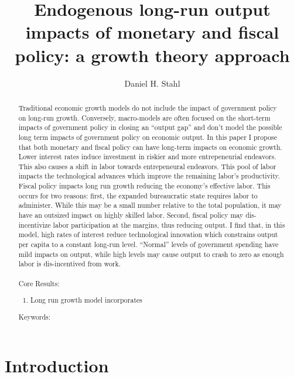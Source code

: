 \documentclass[12pt]{article}
\theoremstyle{definition}
\begin{document}
\title{Endogenous long-run output impacts of monetary and fiscal policy: a growth theory approach}
\date{}
\author{Daniel H. Stahl}

\maketitle

\newpage
 \begin{abstract}

Traditional economic growth models do not include the impact of government policy on long-run growth.  Conversely, macro-models are often focused on the short-term impacts of government policy in closing an ``output gap'' and don't model the possible long term impacts of government policy on economic output.  In this paper I propose that both monetary and fiscal policy can have long-term impacts on economic growth.  Lower interest rates induce investment in riskier and more entrepeneurial endeavors.  This also causes a shift in labor towards entrepeneural endeavors.  This pool of labor impacts the technological advances which improve the remaining labor's productivity.  Fiscal policy impacts long run growth reducing the economy's effective labor.  This occurs for two reasons: first, the expanded bureaucratic state requires labor to administer.  While this may be a small number relative to the total population, it may have an outsized impact on highly skilled labor.  Second, fiscal policy may dis-incentivize labor participation at the margins, thus reducing output.  I find that, in this model, high rates of interest reduce technological innovation which constrains output per capita to a constant long-run level.  ``Normal'' levels of government spending have mild impacts on output, while high levels may cause output to crash to zero as enough labor is dis-incentived from work.   
\\
\\
Core Results:
\begin{enumerate}
\item Long run growth model incorporates

\end{enumerate}

Keywords: 
\end{abstract}


\newpage
\section{Introduction}
\end{document}
